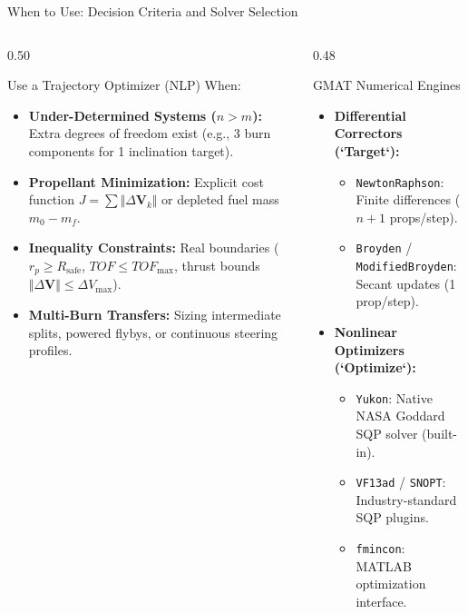 \documentclass[aspectratio=169, 10pt]{beamer}
\begin{document}
\begin{frame}{When to Use: Decision Criteria and Solver Selection}
\begin{columns}[t]
\begin{column}{0.50\textwidth}
            \begin{block}{Use a Trajectory Optimizer (NLP) When:}
                \scriptsize
                \begin{itemize}\setlength{\itemsep}{1.2pt}
                    \item \textbf{Under-Determined Systems ($n > m$):} Extra degrees of freedom exist (e.g., 3 burn components for 1 inclination target).
                    \item \textbf{Propellant Minimization:} Explicit cost function $J = \sum \Vert{}\Delta \mathbf{V}_k\Vert{}$ or depleted fuel mass $m_0 - m_f$.
                    \item \textbf{Inequality Constraints:} Real boundaries ($r_p \ge R_{\text{safe}}$, $TOF \le TOF_{\max}$, thrust bounds $\Vert{}\Delta \mathbf{V}\Vert{} \le \Delta V_{\max}$).
                    \item \textbf{Multi-Burn Transfers:} Sizing intermediate splits, powered flybys, or continuous steering profiles.
                \end{itemize}
            \end{block}
        \end{column}

        \begin{column}{0.48\textwidth}
            \begin{block}{GMAT Numerical Engines}
                \fontsize{5.1pt}{6.1pt}\selectfont
                \begin{itemize}\setlength{\itemsep}{1.2pt}
                    \item \textbf{Differential Correctors (`Target`):}
                    \begin{itemize}\setlength{\itemsep}{0.3pt}
                        \item \texttt{NewtonRaphson}: Finite differences ($n+1$ props/step).
                        \item \texttt{Broyden} / \texttt{ModifiedBroyden}: Secant updates (1 prop/step).
                    \end{itemize}
                    \item \textbf{Nonlinear Optimizers (`Optimize`):}
                    \begin{itemize}\setlength{\itemsep}{0.3pt}
                        \item \texttt{Yukon}: Native NASA Goddard SQP solver (built-in).
                        \item \texttt{VF13ad} / \texttt{SNOPT}: Industry-standard SQP plugins.
                        \item \texttt{fmincon}: MATLAB optimization interface.
                    \end{itemize}
                \end{itemize}
            \end{block}


\end{column}
\end{columns}
\end{frame}
\end{document}
